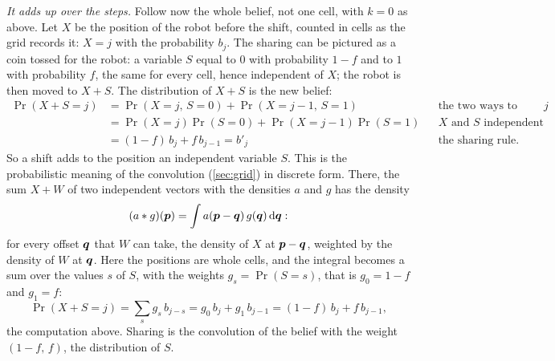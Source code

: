 \emph{It adds up over the steps.} Follow now the whole belief, not one
cell, with $k=0$ as above. Let $X$ be the position of the robot before
the shift, counted in cells as the grid records it: $X=j$ with the
probability $b_j$. The sharing can be pictured as a coin tossed for the
robot: a variable $S$ equal to $0$ with probability $1-f$ and to $1$
with probability $f$, the same for every cell, hence independent of $X$;
the robot is then moved to $X+S$. The distribution of $X+S$ is the new
belief:
\begin{align*}
  \Pr(X+S=j)
  &=\Pr(X=j,\,S=0)+\Pr(X=j-1,\,S=1)
  &&\text{the two ways to reach $j$}\\
  &=\Pr(X=j)\Pr(S=0)+\Pr(X=j-1)\Pr(S=1)
  &&\text{$X$ and $S$ independent}\\
  &=(1-f)\,b_j+f\,b_{j-1}=b'_j
  &&\text{the sharing rule.}
\end{align*}
So a shift adds to the position an independent variable $S$. This is
the probabilistic meaning of the convolution (\cref{sec:grid}) in
discrete form. There, the sum $X+W$ of two independent vectors with the
densities $a$ and $g$ has the density
\[
  (a\ast g)(\bm{p})=\int a(\bm{p}-\bm{q})\,g(\bm{q})\,\mathrm d\bm{q} :
\]
for every offset $\bm{q}$ that $W$ can take, the density of $X$ at
$\bm{p}-\bm{q}$, weighted by the density of $W$ at $\bm{q}$. Here the
positions are whole cells, and the integral becomes a sum over the values
$s$ of $S$, with the weights $g_s=\Pr(S=s)$, that is $g_0=1-f$ and
$g_1=f$:
\[
  \Pr(X+S=j)=\sum_sg_s\,b_{j-s}=g_0\,b_j+g_1\,b_{j-1}
  =(1-f)\,b_j+f\,b_{j-1},
\]
the computation above. Sharing is the convolution of the belief with the
weight $(1-f,\,f)$, the distribution of $S$.

